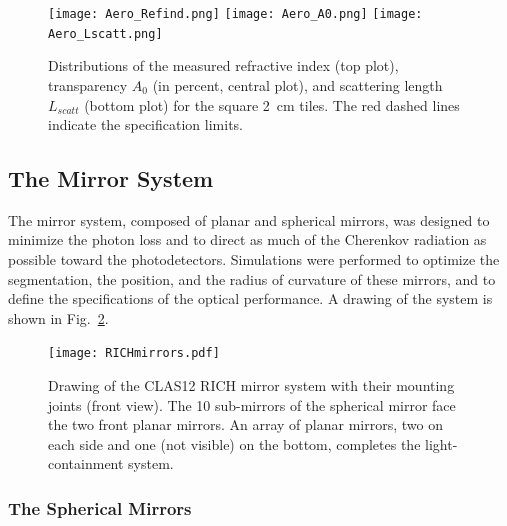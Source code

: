 \documentclass[5p,times,twocolumn]{elsarticle}
\begin{document}
\begin{figure}
\begin{center}
\texttt{[image: Aero\_Refind.png]}
\texttt{[image: Aero\_A0.png]}
\texttt{[image: Aero\_Lscatt.png]}
\caption{Distributions of the measured refractive index (top plot), transparency $A_0$ (in percent, central plot), 
and scattering length $L_{scatt}$ (bottom plot) for the square 2~cm tiles. The red dashed lines indicate the 
specification limits.}
\label{Fig:Aerogel_2cm}
\end{center}
\end{figure}


\subsection{The Mirror System}

The mirror system, composed of planar and spherical mirrors, was designed to minimize the photon loss and to direct
as much of the Cherenkov radiation as possible toward the photodetectors. Simulations were performed to optimize
the segmentation, the position, and the radius of curvature of these mirrors, and to define the specifications of the
optical performance. A drawing of the system is shown in Fig.~\ref{Fig:RICHmirrors}.

\begin{figure}
\begin{center}
\texttt{[image: RICHmirrors.pdf]}
\caption{Drawing of the CLAS12 RICH mirror system with their mounting joints (front view). The 10 sub-mirrors of the spherical mirror face the
two front planar mirrors. An array of planar mirrors, two on each side and one (not visible) on the 
bottom, completes the light-containment system.}
\label{Fig:RICHmirrors}
\end{center}
\end{figure}

\subsubsection{The Spherical Mirrors}
\end{document}
